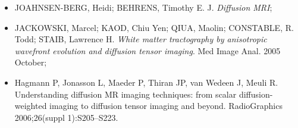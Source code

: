 \documentclass[a4paper,11pt]{report}
\begin{document}
\begin{itemize}
  \item JOAHNSEN-BERG, Heidi; BEHRENS, Timothy E. J. \textit{Diffusion MRI};
  \item JACKOWSKI, Marcel; KAOD, Chiu Yen; QIUA, Maolin; CONSTABLE, R. Todd; STAIB, Lawrence H. \textit{White matter tractography by anisotropic wavefront evolution and diffusion tensor imaging}. Med Image Anal. 2005 October;
  \item Hagmann P, Jonasson L, Maeder P, Thiran JP, van Wedeen J, Meuli R. Understanding diffusion MR imaging techniques: from scalar diffusion-weighted imaging to diffusion tensor imaging and beyond. RadioGraphics 2006;26(suppl 1):S205–S223.
\end{itemize}
\end{document}
